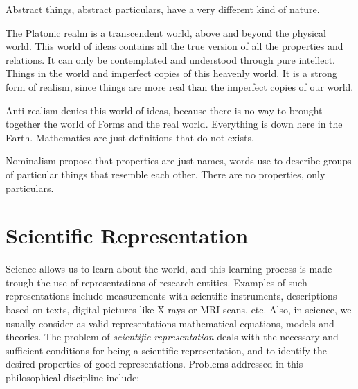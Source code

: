 Abstract things, abstract particulars, have a very different kind of nature.

The Platonic realm is a transcendent world, above and beyond the physical world. This world of ideas contains all the true version of all the properties and relations. It can only be contemplated and understood through pure intellect. Things in the world and imperfect copies of this heavenly world. It is a strong form of realism, since things are more real than the imperfect copies of our world.

Anti-realism denies this world of ideas, because there is no way to brought together the world of Forms and the real world. Everything is down here in the Earth. Mathematics are just definitions that do not exists.

Nominalism propose that properties are just names, words use to describe groups of particular things that resemble each other. There are no properties, only particulars.

\section{Scientific Representation}
\label{sec:scientific_representation}

Science allows us to learn about the world, and this learning process is made trough the use of representations of research entities. Examples of such representations include measurements with scientific instruments, descriptions based on texts, digital pictures like X-rays or MRI scans, etc. Also, in science, we usually consider as valid representations mathematical equations, models and theories. The problem of \emph{scientific representation} deals with the necessary and sufficient conditions for being a scientific representation, and to identify the desired properties of good representations. Problems addressed in this philosophical discipline include:

